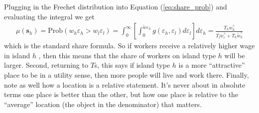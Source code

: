 \documentclass[pdftex,12pt]{article}
\begin{document}
\medskip
\noindent Plugging in the Frechet distribution into Equation (\ref{eq:share_prob}) and evaluating the integral we get
\begin{align}
\mu(\textbf{s}_h) = \mathrm{Prob}\left(w_h \varepsilon_h >  w_l\varepsilon_l\right) = \int_0^{\infty}\left[\int_0^{\tilde w\varepsilon_h}g(\varepsilon_h,\varepsilon_l)d\varepsilon_l\right]d\varepsilon_h = \frac{T_h w_h ^{\gamma}}{T_lw_l^{\gamma} + T_h \tilde w_h ^{\gamma}}
\label{eq:share_formula}
\end{align}
which is the standard share formula. So if workers receive a relatively higher wage in island $h$ , then this means that the share of workers on island type $h$ will be larger. Second, returning to $T$s, this says if island type $h$ is a more ``attractive'' place to be in a utility sense, then more people will live and work there. Finally, note as well how a location is a relative statement. It's never about in absolute terms one place is better than the other, but how one place is relative to the ``average'' location (the object in the denominator) that matters. 
\end{document}
